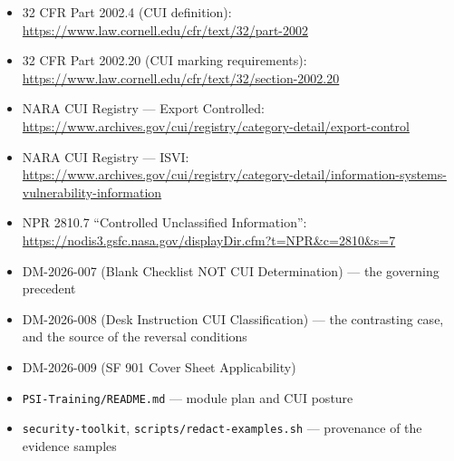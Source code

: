 {\begin{enumerate}

\begin{itemize}
    \item 32 CFR Part 2002.4 (CUI definition): \url{https://www.law.cornell.edu/cfr/text/32/part-2002}
    \item 32 CFR Part 2002.20 (CUI marking requirements): \url{https://www.law.cornell.edu/cfr/text/32/section-2002.20}
    \item NARA CUI Registry --- Export Controlled: \url{https://www.archives.gov/cui/registry/category-detail/export-control}
    \item NARA CUI Registry --- ISVI: \url{https://www.archives.gov/cui/registry/category-detail/information-systems-vulnerability-information}
    \item NPR 2810.7 ``Controlled Unclassified Information'': \url{https://nodis3.gsfc.nasa.gov/displayDir.cfm?t=NPR&c=2810&s=7}
    \item DM-2026-007 (Blank Checklist NOT CUI Determination) --- the governing precedent
    \item DM-2026-008 (Desk Instruction CUI Classification) --- the contrasting case, and the source of the reversal conditions
    \item DM-2026-009 (SF 901 Cover Sheet Applicability)
    \item \texttt{PSI-Training/README.md} --- module plan and CUI posture
    \item \texttt{security-toolkit}, \texttt{scripts/redact-examples.sh} --- provenance of the evidence samples
\end{itemize}

\end{enumerate}
}


